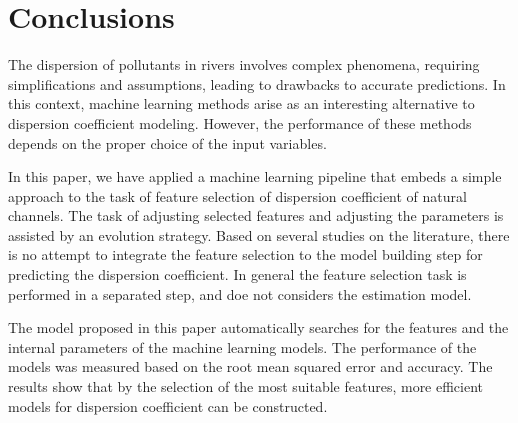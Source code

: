 \documentclass[a4paper,12pt, english]{article}
\begin{document}
\section{\label{sec:conclusions} Conclusions}
The dispersion of pollutants in rivers involves complex phenomena, requiring simplifications and assumptions, leading to drawbacks to accurate predictions. In this context, machine learning methods arise as an interesting alternative to dispersion coefficient modeling. However, the performance of these methods depends on the proper choice of the input variables.

In this paper, we have applied a machine learning pipeline that embeds a simple approach to the task of feature selection of dispersion coefficient of natural channels. 
The task of adjusting selected features and adjusting the parameters is assisted by an evolution strategy.
% 
Based on several studies on the literature, there is no attempt to integrate the feature selection to the model building step for predicting the dispersion coefficient. 
In general the feature selection task is performed in a separated step, and doe not considers the estimation model. 

The model proposed in this paper automatically searches for the features and the internal parameters of the machine learning models.
% 
The performance of the models was measured based on the root mean squared error and accuracy.
The results show that by the selection of the most suitable features, more efficient models for dispersion coefficient can be constructed. 
    






\end{document}
